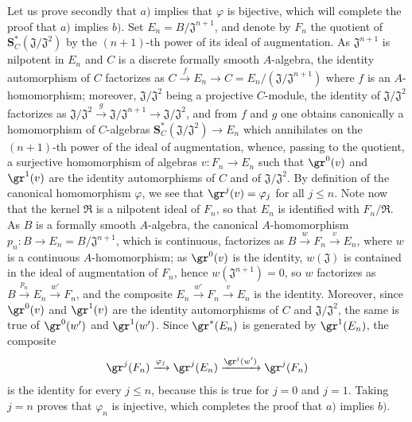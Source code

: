 \begin{env}[19.5.4.2]
\label{0.19.5.4.2}
Let us prove secondly that $a)$ implies that $\varphi$ is bijective, which will complete the proof that $a)$ implies $b)$.
Set $E_n=B/\mathfrak{J}^{n+1}$, and denote by $F_n$ the quotient of $\mathbf{S}_C^*(\mathfrak{J}/\mathfrak{J}^2)$ by the $(n+1)$-th power of its ideal of augmentation.
As $\mathfrak{J}^{n+1}$ is nilpotent in $E_n$ and $C$ is a discrete formally smooth $A$-algebra, the identity automorphism of $C$ factorizes as $C\xrightarrow{f}E_n\to C=E_n/(\mathfrak{J}/\mathfrak{J}^{n+1})$ where $f$ is an $A$-homomorphism;
 moreover, $\mathfrak{J}/\mathfrak{J}^2$ being a projective $C$-module, the identity of $\mathfrak{J}/\mathfrak{J}^2$ factorizes as $\mathfrak{J}/\mathfrak{J}^2\xrightarrow{g}\mathfrak{J}/\mathfrak{J}^{n+1}\to\mathfrak{J}/\mathfrak{J}^2$, and from $f$ and $g$ one obtains canonically a homomorphism of $C$-algebras $\mathbf{S}_C^*(\mathfrak{J}/\mathfrak{J}^2)\to E_n$ which annihilates on the $(n+1)$-th power of the ideal of augmentation, whence, passing to the quotient, a surjective homomorphism of algebras $v:F_n\to E_n$ such that $\gr^0(v)$ and $\gr^1(v)$ are the identity automorphisms of $C$ and of $\mathfrak{J}/\mathfrak{J}^2$.
By definition of the canonical homomorphism $\varphi$, we see that $\gr^j(v)=\varphi_j$ for all $j\leq n$.
Note now that the kernel $\mathfrak{R}$ is a nilpotent ideal of $F_n$, so that $E_n$ is identified with $F_n/\mathfrak{R}$.
As $B$ is a formally smooth $A$-algebra, the canonical $A$-homomorphism $p_n:B\to E_n=B/\mathfrak{J}^{n+1}$, which is continuous, factorizes as $B\xrightarrow{w}F_n\xrightarrow{v}E_n$, where $w$ is a continuous $A$-homomorphism;
as $\gr^0(v)$ is the identity, $w(\mathfrak{J})$ is contained in the ideal of augmentation of $F_n$, hence $w(\mathfrak{J}^{n+1})=0$,
so $w$ factorizes as $B\xrightarrow{p_n}E_n\xrightarrow{w'}F_n$, and the composite $E_n\xrightarrow{w'}F_n\xrightarrow{v}E_n$ is the identity.
Moreover, since $\gr^0(v)$ and $\gr^1(v)$ are the identity automorphisms of $C$ and $\mathfrak{J}/\mathfrak{J}^2$, the same is true of $\gr^0(w')$ and $\gr^1(w')$.
Since $\gr^*(E_n)$ is generated by $\gr^1(E_n)$, the composite
\[
  \gr^j(F_n)\xrightarrow{\varphi_j}\gr^j(E_n)
  \xrightarrow{\gr^j(w')}\gr^j(F_n)
\]
is the identity for every $j\leq n$, because this is true for $j=0$ and $j=1$.
Taking $j=n$ proves that $\varphi_n$ is injective, which completes the proof that $a)$ implies $b)$.
\end{env}

